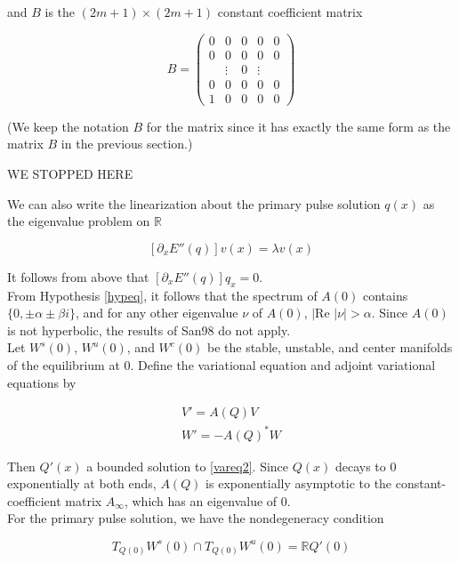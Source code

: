 \documentclass[12pt]{article}
\def\R{{\mathbb R}}
\begin{document}
and $B$ is the $(2m +1) \times (2m+1)$ constant coefficient matrix

\begin{equation}\label{DefB}
B = \begin{pmatrix}0 & 0 & 0 & 0 & 0 \\0 & 0 & 0 & 0 & 0 \\  & 
\vdots & 0 & \vdots & \\0 & 0 & 0 & 0 & 0 \\1 & 0 & 0 & 0 & 0 \end{pmatrix} 
\end{equation}

(We keep the notation $B$ for the matrix since it has exactly the same form as the matrix $B$ in the previous section.)

WE STOPPED HERE

We can also write the linearization about the primary pulse solution $q(x)$ as the eigenvalue problem on $\R$

\begin{equation}\label{eigonR}
[ \partial_x E''(q) ] v(x) = \lambda v(x)
\end{equation}

It follows from above that $[ \partial_x E''(q) ] q_x = 0$.
\\

From Hypothesis \ref{hypeq}, it follows that the spectrum of $A(0)$ contains $\{ 0, \pm \alpha \pm \beta i\}$, and for any other eigenvalue $\nu$ of $A(0)$, $|\text{Re }|\nu| > \alpha$. Since $A(0)$ is not hyperbolic, the results of San98 do not apply.\\

Let $W^s(0)$, $W^u(0)$, and $W^c(0)$ be the stable, unstable, and center manifolds of the equilibrium at 0. Define the variational equation and adjoint variational equations by

\begin{align}
V' = A(Q) V \label{vareq2} \\
W' = -A(Q)^* W \label{adjvareq2}
\end{align}

Then $Q'(x)$ a bounded solution to \eqref{vareq2}. Since $Q(x)$ decays to 0 exponentially at both ends, $A(Q)$ is exponentially asymptotic to the constant-coefficient matrix $A_\infty$, which has an eigenvalue of 0. \\

For the primary pulse solution, we have the nondegeneracy condition

\begin{equation}\label{nondegen2}
T_{Q(0)}W^s(0) \cap T_{Q(0)}W^u(0) = \R Q'(0)
\end{equation}
\end{document}
